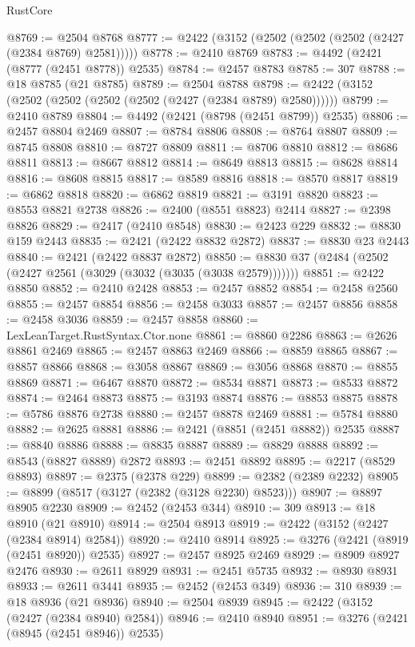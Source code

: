 \begin{lexlean}{RustCore}
\begin{coremodule}
@8769 := @2504 @8768
@8777 := @2422 (@3152 (@2502 (@2502 (@2502 (@2427 (@2384 @8769) @2581)))))
@8778 := @2410 @8769
@8783 := @4492 (@2421 (@8777 (@2451 @8778)) @2535)
@8784 := @2457 @8783
@8785 := 307
@8788 := @18 @8785 (@21 @8785)
@8789 := @2504 @8788
@8798 := @2422 (@3152 (@2502 (@2502 (@2502 (@2502 (@2427 (@2384 @8789) @2580))))))
@8799 := @2410 @8789
@8804 := @4492 (@2421 (@8798 (@2451 @8799)) @2535)
@8806 := @2457 @8804 @2469
@8807 := @8784 @8806
@8808 := @8764 @8807
@8809 := @8745 @8808
@8810 := @8727 @8809
@8811 := @8706 @8810
@8812 := @8686 @8811
@8813 := @8667 @8812
@8814 := @8649 @8813
@8815 := @8628 @8814
@8816 := @8608 @8815
@8817 := @8589 @8816
@8818 := @8570 @8817
@8819 := @6862 @8818
@8820 := @6862 @8819
@8821 := @3191 @8820
@8823 := @8553 @8821 @2738
@8826 := @2400 (@8551 @8823) @2414
@8827 := @2398 @8826
@8829 := @2417 (@2410 @8548)
@8830 := @2423 @229
@8832 := @8830 @159 @2443
@8835 := @2421 (@2422 @8832 @2872)
@8837 := @8830 @23 @2443
@8840 := @2421 (@2422 @8837 @2872)
@8850 := @8830 @37 (@2484 (@2502 (@2427 @2561 (@3029 (@3032 (@3035 (@3038 @2579)))))))
@8851 := @2422 @8850
@8852 := @2410 @2428
@8853 := @2457 @8852
@8854 := @2458 @2560
@8855 := @2457 @8854
@8856 := @2458 @3033
@8857 := @2457 @8856
@8858 := @2458 @3036
@8859 := @2457 @8858
@8860 := LexLeanTarget.RustSyntax.Ctor.none
@8861 := @8860 @2286
@8863 := @2626 @8861 @2469
@8865 := @2457 @8863 @2469
@8866 := @8859 @8865
@8867 := @8857 @8866
@8868 := @3058 @8867
@8869 := @3056 @8868
@8870 := @8855 @8869
@8871 := @6467 @8870
@8872 := @8534 @8871
@8873 := @8533 @8872
@8874 := @2464 @8873
@8875 := @3193 @8874
@8876 := @8853 @8875
@8878 := @5786 @8876 @2738
@8880 := @2457 @8878 @2469
@8881 := @5784 @8880
@8882 := @2625 @8881
@8886 := @2421 (@8851 (@2451 @8882)) @2535
@8887 := @8840 @8886
@8888 := @8835 @8887
@8889 := @8829 @8888
@8892 := @8543 (@8827 @8889) @2872
@8893 := @2451 @8892
@8895 := @2217 (@8529 @8893)
@8897 := @2375 (@2378 @229)
@8899 := @2382 (@2389 @2232)
@8905 := @8899 (@8517 (@3127 (@2382 (@3128 @2230) @8523)))
@8907 := @8897 @8905 @2230
@8909 := @2452 (@2453 @344)
@8910 := 309
@8913 := @18 @8910 (@21 @8910)
@8914 := @2504 @8913
@8919 := @2422 (@3152 (@2427 (@2384 @8914) @2584))
@8920 := @2410 @8914
@8925 := @3276 (@2421 (@8919 (@2451 @8920)) @2535)
@8927 := @2457 @8925 @2469
@8929 := @8909 @8927 @2476
@8930 := @2611 @8929
@8931 := @2451 @5735
@8932 := @8930 @8931
@8933 := @2611 @3441
@8935 := @2452 (@2453 @349)
@8936 := 310
@8939 := @18 @8936 (@21 @8936)
@8940 := @2504 @8939
@8945 := @2422 (@3152 (@2427 (@2384 @8940) @2584))
@8946 := @2410 @8940
@8951 := @3276 (@2421 (@8945 (@2451 @8946)) @2535)

\end{coremodule}
\end{lexlean}
